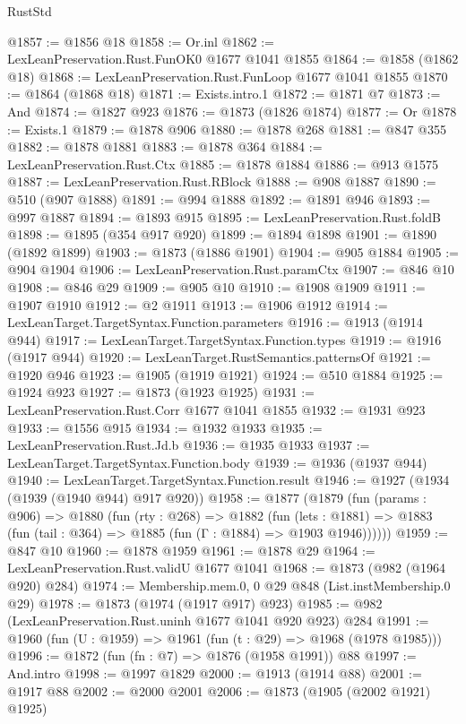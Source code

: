 \begin{lexlean}{RustStd}
\begin{coremodule}
@1857 := @1856 @18
@1858 := Or.inl
@1862 := LexLeanPreservation.Rust.FunOK0 @1677 @1041 @1855
@1864 := @1858 (@1862 @18)
@1868 := LexLeanPreservation.Rust.FunLoop @1677 @1041 @1855
@1870 := @1864 (@1868 @18)
@1871 := Exists.intro.{1}
@1872 := @1871 @7
@1873 := And
@1874 := @1827 @923
@1876 := @1873 (@1826 @1874)
@1877 := Or
@1878 := Exists.{1}
@1879 := @1878 @906
@1880 := @1878 @268
@1881 := @847 @355
@1882 := @1878 @1881
@1883 := @1878 @364
@1884 := LexLeanPreservation.Rust.Ctx
@1885 := @1878 @1884
@1886 := @913 @1575
@1887 := LexLeanPreservation.Rust.RBlock
@1888 := @908 @1887
@1890 := @510 (@907 @1888)
@1891 := @994 @1888
@1892 := @1891 @946
@1893 := @997 @1887
@1894 := @1893 @915
@1895 := LexLeanPreservation.Rust.foldB
@1898 := @1895 (@354 @917 @920)
@1899 := @1894 @1898
@1901 := @1890 (@1892 @1899)
@1903 := @1873 (@1886 @1901)
@1904 := @905 @1884
@1905 := @904 @1904
@1906 := LexLeanPreservation.Rust.paramCtx
@1907 := @846 @10
@1908 := @846 @29
@1909 := @905 @10
@1910 := @1908 @1909
@1911 := @1907 @1910
@1912 := @2 @1911
@1913 := @1906 @1912
@1914 := LexLeanTarget.TargetSyntax.Function.parameters
@1916 := @1913 (@1914 @944)
@1917 := LexLeanTarget.TargetSyntax.Function.types
@1919 := @1916 (@1917 @944)
@1920 := LexLeanTarget.RustSemantics.patternsOf
@1921 := @1920 @946
@1923 := @1905 (@1919 @1921)
@1924 := @510 @1884
@1925 := @1924 @923
@1927 := @1873 (@1923 @1925)
@1931 := LexLeanPreservation.Rust.Corr @1677 @1041 @1855
@1932 := @1931 @923
@1933 := @1556 @915
@1934 := @1932 @1933
@1935 := LexLeanPreservation.Rust.Jd.b
@1936 := @1935 @1933
@1937 := LexLeanTarget.TargetSyntax.Function.body
@1939 := @1936 (@1937 @944)
@1940 := LexLeanTarget.TargetSyntax.Function.result
@1946 := @1927 (@1934 (@1939 (@1940 @944) @917 @920))
@1958 := @1877
    (@1879
      (fun (params : @906) =>
      @1880
        (fun (rty : @268) =>
        @1882
          (fun (lets : @1881) =>
          @1883 (fun (tail : @364) => @1885 (fun (Γ : @1884) => @1903 @1946))))))
@1959 := @847 @10
@1960 := @1878 @1959
@1961 := @1878 @29
@1964 := LexLeanPreservation.Rust.validU @1677 @1041
@1968 := @1873 (@982 (@1964 @920) @284)
@1974 := Membership.mem.{0, 0} @29 @848 (List.instMembership.{0} @29)
@1978 := @1873 (@1974 (@1917 @917) @923)
@1985 := @982 (LexLeanPreservation.Rust.uninh @1677 @1041 @920 @923) @284
@1991 := @1960 (fun (U : @1959) => @1961 (fun (t : @29) => @1968 (@1978 @1985)))
@1996 := @1872 (fun (fn : @7) => @1876 (@1958 @1991)) @88
@1997 := And.intro
@1998 := @1997 @1829
@2000 := @1913 (@1914 @88)
@2001 := @1917 @88
@2002 := @2000 @2001
@2006 := @1873 (@1905 (@2002 @1921) @1925)

\end{coremodule}
\end{lexlean}
